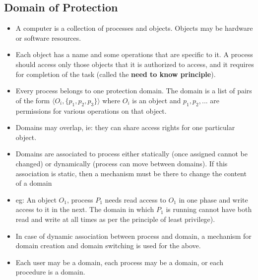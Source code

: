 \documentclass{article}
\theoremstyle{plain}
\theoremstyle{definition}
\begin{document}
\subsection{Domain of Protection}
\begin{itemize}
    \item A computer is a collection of processes and objects. Objects may be hardware or software resources. 
    
    \item Each object has a name and some operations that are specific to it. A process should access only those objects that it is authorized to access, and it requires for completion of the task (called the \textbf{need to know principle}). 
    
    \item Every process belongs to one protection domain. The domain is a list of pairs of the form $\langle O_i,  \{ p_1, p_2, p_3 \} \rangle$ where $O_i$ is an object and $p_1, p_2, ...$ are permissions for various operations on that object. 
    
    \item Domains may overlap, ie: they can share access rights for one particular object. 
    
    \item Domains are associated to process either statically (once assigned cannot be changed) or dynamically (process can move between domains). If this association is static, then a mechanism must be there to change the content of a domain 
    
    \item eg: An object $O_1$, process $P_1$ needs read access to $O_1$ in one phase and write access to it in the next. The domain in which $P_1$ is running cannot have both read and write at all times as per the principle of least privilege). 
    
    \item In case of dynamic association between process and domain, a mechanism for domain creation and domain switching is used for the above. 
    
    \item Each user may be a domain, each process may be a domain, or each procedure is a domain. 
\end{itemize}
\end{document}
